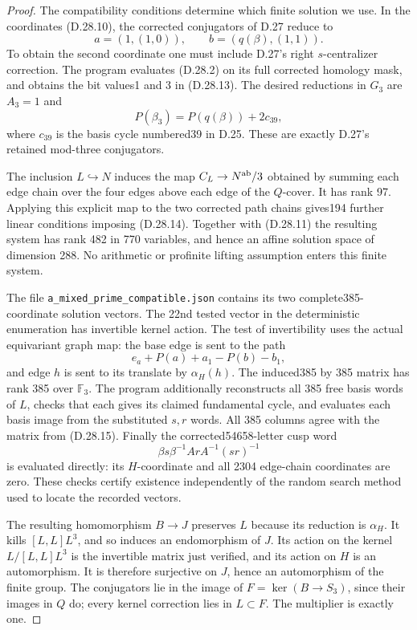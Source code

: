 \begin{proof}
The compatibility conditions determine which finite
solution we use. In the coordinates (D.28.10), the
corrected conjugators of D.27 reduce to
\[
 a=(1,(1,0)),\qquad b=(q(\beta),(1,1)).                 \tag{D.28.13}
\]
To obtain the second coordinate one must include D.27's
right $s$-centralizer correction. The program evaluates
(D.28.2) on its full corrected homology mask, and
obtains the bit values1 and 3 in (D.28.13).
The desired reductions in $G_3$ are $A_3=1$ and
\[
                  P(\beta_3)=P(q(\beta))+2c_{39},     \tag{D.28.14}
\]
where $c_{39}$ is the basis cycle numbered39 in D.25.
These are exactly D.27's retained mod-three conjugators.

The inclusion $L\hookrightarrow N$ induces the map
$C_L\to N^{\rm ab}/3$ obtained by summing each edge chain
over the four edges above each edge of the $Q$-cover.
It has rank 97. Applying this explicit map to the two
corrected path chains gives194 further linear conditions
imposing (D.28.14). Together with (D.28.11) the resulting
system has rank 482 in 770 variables, and hence an affine
solution space of dimension 288. No arithmetic or
profinite lifting assumption enters this finite system.

The file \texttt{a\_mixed\_prime\_compatible.json}
contains its two complete385-coordinate solution vectors.
The 22nd tested vector in the deterministic enumeration
has invertible kernel action. The test of invertibility
uses the actual equivariant graph map: the base edge is
sent to the path
\[
        e_a+P(a)+a_1-P(b)-b_1,                          \tag{D.28.15}
\]
and edge $h$ is sent to its translate by $\alpha_H(h)$.
The induced385 by 385 matrix has rank 385 over
$\mathbb F_3$. The program additionally reconstructs all
385 free basis words of $L$, checks that each gives its
claimed fundamental cycle, and evaluates each basis
image from the substituted $s,r$ words. All 385 columns
agree with the matrix from (D.28.15). Finally the
corrected54658-letter cusp word
\[
       \beta s\beta^{-1}ArA^{-1}(sr)^{-1}
\]
is evaluated directly: its $H$-coordinate and all 2304
edge-chain coordinates are zero. These checks certify
existence independently of the random search method
used to locate the recorded vectors.

The resulting homomorphism $B\to J$ preserves $L$ because
its reduction is $\alpha_H$. It kills $[L,L]L^3$, and so
induces an endomorphism of $J$. Its action on the kernel
$L/[L,L]L^3$ is the invertible matrix just verified, and
its action on $H$ is an automorphism. It is therefore
surjective on $J$, hence an automorphism of the finite
group. The conjugators lie in the image of
$F=\ker(B\to S_3)$, since their images in $Q$ do; every
kernel correction lies in $L\subset F$. The multiplier
is exactly one.


\end{proof}
